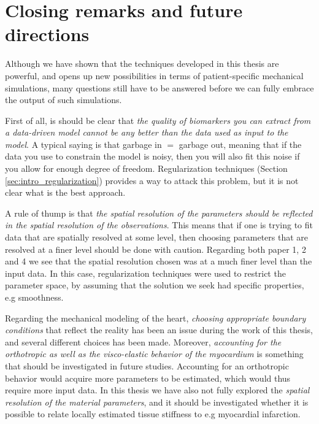 \section{Closing remarks and future directions}

Although we have shown that the techniques developed in
this thesis are powerful, and opens up new possibilities in terms of
patient-specific mechanical simulations, many questions still have to
be answered before we can fully embrace the output of such simulations.

First of all, is should be clear that \emph{the
  quality of biomarkers you can extract from a data-driven
  model cannot be any better than the data used as input to the
  model}. A typical saying is that garbage in $=$ garbage out,
meaning that if the data you use to constrain the model is noisy, then
you will also fit this noise if you allow for enough degree of
freedom. Regularization techniques (Section
\ref{sec:intro_regularization}) provides a way to attack this problem,
but it is not clear what is the best approach.

A rule of thump is that \emph{the spatial resolution of the parameters should be
  reflected in the spatial resolution of the observations}. This means
that if one is trying to fit data that are spatially resolved at some level,
then choosing parameters that are resolved at a finer level should be
done with caution. Regarding both paper 1, 2 and 4 we see that the
spatial resolution chosen was at a much finer level than the input
data. In this case, regularization techniques were used to restrict the
parameter space, by assuming that the solution we seek had specific
properties, e.g smoothness.

Regarding the mechanical modeling of the heart, 
\emph{choosing appropriate boundary conditions} that reflect the reality has
been an issue during the work of this thesis, and several different
choices has been made. Moreover, \emph{accounting for the orthotropic as
well as the visco-elastic behavior of the myocardium} is something that should
be investigated in future studies. Accounting for an orthotropic
behavior would acquire more parameters to be estimated, which would
thus require more input data.
In this thesis we have also not fully
explored the \emph{spatial resolution of the material parameters}, and it
should be investigated whether it is possible to relate locally estimated
tissue stiffness to e.g myocardial infarction.

